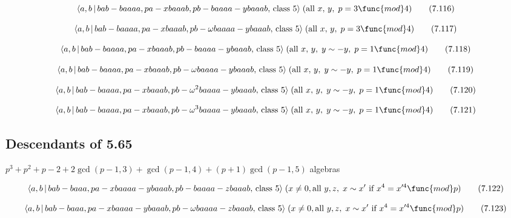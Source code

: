 \documentclass[10pt]{article}
\begin{document}
\begin{equation}
\langle a,b\,|\,bab-baaaa,pa-xbaaab,pb-baaaa-ybaaab,\,\text{class }5\rangle
\;(\text{all }x,\,y,\;p=3\func{mod}4)  \tag{7.116}
\end{equation}

\begin{equation}
\langle a,b\,|\,bab-baaaa,pa-xbaaab,pb-\omega baaaa-ybaaab,\,\text{class }%
5\rangle \;(\text{all }x,\,y,\;p=3\func{mod}4)  \tag{7.117}
\end{equation}

\begin{equation}
\langle a,b\,|\,bab-baaaa,pa-xbaaab,pb-baaaa-ybaaab,\,\text{class }5\rangle
\;(\text{all }x,\,y,\;y\sim -y,\;p=1\func{mod}4)  \tag{7.118}
\end{equation}

\begin{equation}
\langle a,b\,|\,bab-baaaa,pa-xbaaab,pb-\omega baaaa-ybaaab,\,\text{class }%
5\rangle \;(\text{all }x,\,y,\;y\sim -y,\;p=1\func{mod}4)  \tag{7.119}
\end{equation}

\begin{equation}
\langle a,b\,|\,bab-baaaa,pa-xbaaab,pb-\omega ^{2}baaaa-ybaaab,\,\text{class 
}5\rangle \;(\text{all }x,\,y,\;y\sim -y,\;p=1\func{mod}4)  \tag{7.120}
\end{equation}

\begin{equation}
\langle a,b\,|\,bab-baaaa,pa-xbaaab,pb-\omega ^{3}baaaa-ybaaab,\,\text{class 
}5\rangle \;(\text{all }x,\,y,\;y\sim -y,\;p=1\func{mod}4)  \tag{7.121}
\end{equation}

\subsection{Descendants of 5.65}

$p^{3}+p^{2}+p-2+2\gcd (p-1,3)+\gcd (p-1,4)+(p+1)\gcd (p-1,5)$ algebras

\begin{equation}
\langle a,b\,|\,bab-baaa,pa-xbaaaa-ybaaab,pb-baaaa-zbaaab,\,\text{class }%
5\rangle \;(x\neq 0,\text{all }y,z,\;x\sim x^{\prime }\text{ if }%
x^{4}=x^{\prime 4}\func{mod}p)  \tag{7.122}
\end{equation}

\begin{equation}
\langle a,b\,|\,bab-baaa,pa-xbaaaa-ybaaab,pb-\omega baaaa-zbaaab,\,\text{%
class }5\rangle \;(x\neq 0,\text{all }y,z,\;x\sim x^{\prime }\text{ if }%
x^{4}=x^{\prime 4}\func{mod}p)  \tag{7.123}
\end{equation}
\end{document}
